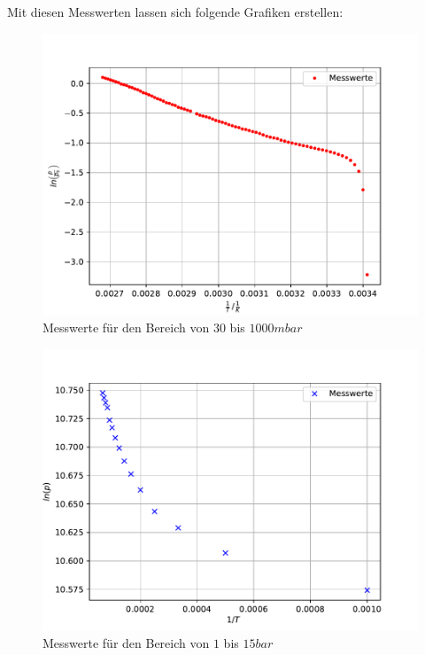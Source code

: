 Mit diesen Messwerten lassen sich folgende Grafiken erstellen:
\begin{figure}
    \includegraphics{Python/plota.pdf}
    \caption{Messwerte für den Bereich von $30$ bis $1000 mbar$}
    \label{fig:MesswerteKlein}
\end{figure}
\begin{figure}
    \includegraphics{Python/plotb.pdf}
    \caption{Messwerte für den Bereich von $1$ bis $15 bar$}
    \label{fig:MesswerteGross}
\end{figure}
